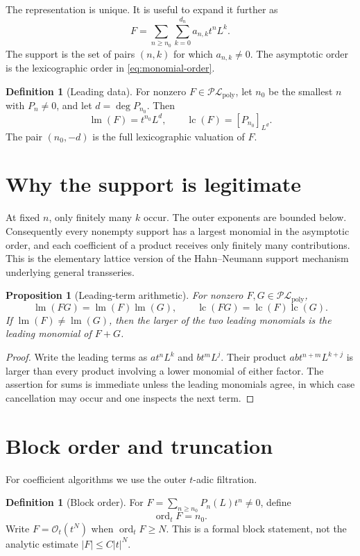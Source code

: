 \documentclass[11pt,oneside]{book}
\newtheorem{proposition}[theorem]{Proposition}
\theoremstyle{definition}
\newtheorem{definition}[theorem]{Definition}
\theoremstyle{remark}
\DeclareMathOperator{\ord}{ord}
\DeclareMathOperator{\lm}{lm}
\DeclareMathOperator{\lc}{lc}
\newcommand{\PLpoly}{\mathscr{PL}_{\mathrm{poly}}}
\newcommand{\bigO}{\mathcal O}
\newcommand{\coeff}[2]{\left[#1\right]_{#2}}
\begin{document}
The representation is unique.  It is useful to expand it further as
\[
 F=\sum_{n\ge n_0}\sum_{k=0}^{d_n}a_{n,k}t^nL^k.
\]
The support is the set of pairs $(n,k)$ for which $a_{n,k}\ne0$.
The asymptotic order is the lexicographic order in \eqref{eq:monomial-order}.

\begin{definition}[Leading data]
For nonzero $F\in\PLpoly$, let $n_0$ be the smallest $n$ with
$P_n\ne0$, and let $d=\deg P_{n_0}$.  Then
\[
 \lm(F)=t^{n_0}L^d,
 \qquad
 \lc(F)=\coeff{P_{n_0}}{L^d}.
\]
The pair $(n_0,-d)$ is the full lexicographic valuation of $F$.
\end{definition}

\section{Why the support is legitimate}
At fixed $n$, only finitely many $k$ occur.  The outer exponents are bounded
below.  Consequently every nonempty support has a largest monomial in the
asymptotic order, and each coefficient of a product receives only finitely
many contributions.  This is the elementary lattice version of the
Hahn--Neumann support mechanism underlying general transseries.

\begin{proposition}[Leading-term arithmetic]\label{prop:leading-arithmetic}
For nonzero $F,G\in\PLpoly$,
\[
 \lm(FG)=\lm(F)\lm(G),
 \qquad
 \lc(FG)=\lc(F)\lc(G).
\]
If $\lm(F)\ne\lm(G)$, then the larger of the two leading monomials is the
leading monomial of $F+G$.
\end{proposition}
\begin{proof}
Write the leading terms as $a t^nL^k$ and $b t^mL^j$.  Their product
$ab t^{n+m}L^{k+j}$ is larger than every product involving a lower monomial
of either factor.  The assertion for sums is immediate unless the leading
monomials agree, in which case cancellation may occur and one inspects the
next term.
\end{proof}

\section{Block order and truncation}
For coefficient algorithms we use the outer $t$-adic filtration.

\begin{definition}[Block order]
For $F=\sum_{n\ge n_0}P_n(L)t^n\ne0$, define
\[
 \ord_tF=n_0.
\]
Write $F=\bigO_t(t^N)$ when $\ord_tF\ge N$.  This is a formal block statement,
not the analytic estimate $|F|\le C|t|^N$.
\end{definition}
\end{document}
